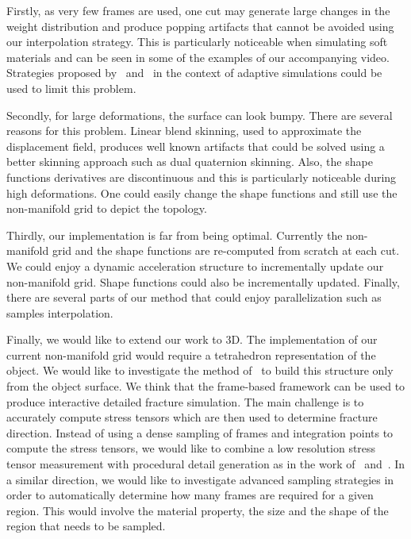 Firstly, as very few frames are used, one cut may generate large changes in the weight distribution and produce popping artifacts that cannot be avoided using our interpolation strategy. This is particularly noticeable when simulating soft materials and can be seen in some of the examples of our accompanying video. Strategies proposed by~\cite{Narain2013} and~\cite{Tournier2014} in the context of adaptive simulations could be used to limit this problem. 

Secondly, for large deformations, the surface can look bumpy. There are several reasons for this problem. Linear blend skinning, used to approximate the displacement field, produces well known artifacts that could be solved using a better skinning approach such as dual quaternion skinning. Also, the shape functions derivatives are discontinuous and this is particularly noticeable during high deformations. One could easily change the shape functions and still use the non-manifold grid to depict the topology.

Thirdly, our implementation is far from being optimal. Currently the non-manifold grid and the shape functions are re-computed from scratch at each cut. We could enjoy a dynamic acceleration structure to incrementally update our non-manifold grid. Shape functions could also be incrementally updated. Finally, there are several parts of our method that could enjoy parallelization such as samples interpolation.

Finally, we would like to extend our work to 3D. The implementation of our current non-manifold grid would require a tetrahedron representation of the object. We would like to investigate the method of~\cite{Remillard2013} to build this structure only from the object surface. We think that the frame-based framework can be used to produce interactive detailed fracture simulation. The main challenge is to accurately compute stress tensors which are then used to determine fracture direction. Instead of using a dense sampling of frames and integration points to compute the stress tensors, we would like to combine a low resolution stress tensor measurement with procedural detail generation as in the work of~\cite{Chen2014} and~\cite{Lejemble2015}. In a similar direction, we would like to investigate advanced sampling strategies in order to automatically determine how many frames are required for a given region. This would involve the material property, the size and the shape of the region that needs to be sampled.
